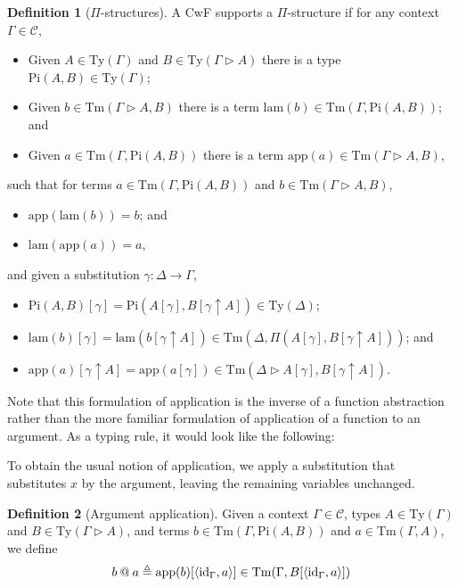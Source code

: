 \documentclass{article}
\renewcommand{\_}{\textrm{\textscale{.5}{\textunderscore}}}
\DeclarePairedDelimiter{\ctxt}{\langle}{\rangle}
\newcommand{\Tm}{\mathrm{Tm}}
\newcommand{\Ty}{\mathrm{Ty}}
\newcommand{\id}{\mathrm{id}}
\newcommand{\pitype}{\mathrm{Pi}}
\newcommand{\lam}{\mathrm{lam}}
\newcommand{\app}{\mathrm{app}}
\theoremstyle{definition}
\newtheorem{definition}{Definition}[section]
\theoremstyle{plain}
\begin{document}
\begin{definition}[$\Pi$-structures]
A CwF supports a $\Pi$-structure if for any context $\Gamma \in \mathcal{C}$,
\begin{itemize}
    \item Given $A \in \Ty(\Gamma)$ and $B \in \Ty(\Gamma \rhd A)$
    there is a type $\pitype(A, B) \in \Ty(\Gamma)$;
    \item Given $b \in \Tm(\Gamma \rhd A, B)$
    there is a term $\lam(b) \in \Tm(\Gamma, \pitype(A, B))$; and
    \item Given $a \in \Tm(\Gamma, \pitype(A, B))$
    there is a term $\app(a) \in \Tm(\Gamma \rhd A, B)$,
\end{itemize}
such that for terms $a \in \Tm(\Gamma, \pitype(A, B))$ and $b \in \Tm(\Gamma \rhd A, B)$,
\begin{itemize}
    \item $\app(\lam(b)) = b$; and
    \item $\lam(\app(a)) = a$,
\end{itemize}
and given a substitution $\gamma : \Delta \to \Gamma$,
\begin{itemize}
    \item $\pitype(A, B)[\gamma] = \pitype(A[\gamma], B[\gamma \uparrow A]) \in \Ty(\Delta)$;
    \item $\lam(b)[\gamma] = \lam(b[\gamma \uparrow A]) \in \Tm(\Delta, \Pi(A[\gamma], B[\gamma \uparrow A]))$; and
    \item $\app(a)[\gamma \uparrow A] = \app(a[\gamma]) \in \Tm(\Delta \rhd A[\gamma], B[\gamma \uparrow A])$.
\end{itemize}
\end{definition}

Note that this formulation of application is the inverse of a function abstraction
rather than the more familiar formulation of application of a function to an argument.
As a typing rule, it would look like the following:
%
\begin{mathpar}
\end{mathpar}
%
To obtain the usual notion of application,
we apply a substitution that substitutes $x$ by the argument,
leaving the remaining variables unchanged.

\begin{definition}[Argument application]
Given a context $\Gamma \in \mathcal{C}$, types $A \in \Ty(\Gamma)$ and $B \in \Ty(\Gamma \rhd A)$,
and terms $b \in \Tm(\Gamma, \pitype(A, B))$ and $a \in \Tm(\Gamma, A)$, we define
$$b \mathbin{@} a \triangleq \app(b)[\ctxt{\id_{\Gamma}, a}] \in \Tm(\Gamma, B[\ctxt{\id_{\Gamma}, a}])$$
\end{definition}
\end{document}
